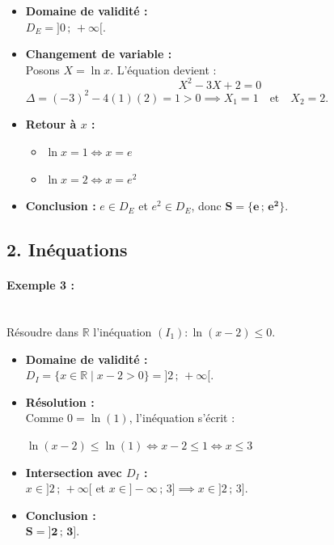 \documentclass[12pt,a4paper]{article}
\begin{document}
\begin{itemize}
    \item \textbf{Domaine de validité :}\\ $D_E = ]0 \,;\, +\infty[$.
    \item \textbf{Changement de variable :}\\ Posons $X = \ln x$. L'équation devient :
    \[
    X^2 - 3X + 2 = 0
    \]
    $\Delta = (-3)^2 - 4(1)(2) = 1 > 0 \implies X_1 = 1 \quad \text{et} \quad X_2 = 2$.
    \item \textbf{Retour à $x$ :}
    \begin{itemize}
        \item $\ln x = 1 \iff x = e$
        \item $\ln x = 2 \iff x = e^2$
    \end{itemize}
    \item \textbf{Conclusion :} $e \in D_E$ et $e^2 \in D_E$, donc $\mathbf{S = \{e \,;\, e^2\}}$.
\end{itemize}

\subsection*{\color{myred}2. Inéquations}

\paragraph{Exemple 3 :}\mbox{}\\[2mm]
Résoudre dans $\mathbb{R}$ l'inéquation $(I_1) : \ln(x - 2) \le 0$.

\begin{itemize}
    \item \textbf{Domaine de validité :}\mbox{}\\[2mm] $D_I = \{x \in \mathbb{R} \mid x - 2 > 0\} = ]2 \,;\, +\infty[$.
    \item \textbf{Résolution :}\mbox{}\\[2mm]
    Comme $0 = \ln(1)$, l'inéquation s'écrit :
    
    $
    \ln(x - 2) \le \ln(1) \iff x - 2 \le 1 \iff x \le 3
    $
    \item \textbf{Intersection avec $D_I$ :}\mbox{}\\[2mm] $x \in ]2 \,;\, +\infty[$ et $x \in ]-\infty \,;\, 3] \implies x \in ]2 \,;\, 3]$.
    \item \textbf{Conclusion :}\mbox{}\\[2mm] $\mathbf{S = ]2 \,;\, 3]}$.
\end{itemize}
\end{document}

